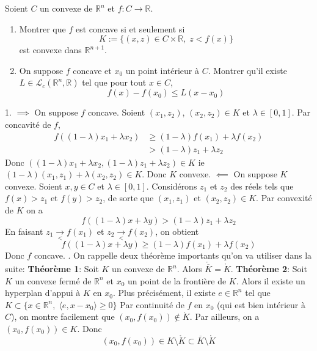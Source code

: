 \documentclass{fancybook}
\begin{document}
\begin{exercice}
Soient $C$ un convexe de $\mathbb R^n$ et $f:C\to \mathbb R$.
\begin{enumerate}
\item Montrer que $f$ est concave si et seulement si $$K:=\{(x,z)\in C\times \mathbb R, \; z<f(x)\}$$ est convexe dans $\mathbb R^{n+1}$.
\item On suppose $f$ concave et $x_0$ un point intérieur à $C$. Montrer qu'il existe $L\in \mathcal L_c(\mathbb R^n,\mathbb R)$ tel que pour tout $x\in C$, $$f(x)-f(x_0)\leq L(x-x_0)$$
\end{enumerate}
\end{exercice}
1. $\implies$ On suppose $f$ concave. Soient $(x_1,z_2)$, $(x_2,z_2)\in K$ et $\lambda \in [0,1]$. Par concavité de $f$,
$$\begin{aligned}
f((1-\lambda)x_1+\lambda x_2) &\geq (1-\lambda)f(x_1) + \lambda f(x_2)\\
&> (1-\lambda)z_1 + \lambda z_2
\end{aligned}$$
Donc $((1-\lambda)x_1+\lambda x_2, (1-\lambda)z_1 + \lambda z_2)\in K$ ie $(1-\lambda)(x_1,z_1)+\lambda (x_2,z_2)\in K$. \newline
Donc $K$ convexe. \newline 
\newline
$\impliedby$ On suppose $K$ convexe. Soient $x,y\in C$ et $\lambda \in [0,1]$. Considérons $z_1$ et $z_2$ des réels tels que $f(x)>z_1$ et $f(y)>z_2$, de sorte que $(x_1,z_1)$ et $(x_2,z_2)\in K$. Par convexité de $K$ on a $$f((1-\lambda)x+\lambda y)>(1-\lambda)z_1 + \lambda z_2 $$
En faisant $z_1\xrightarrow[<]{}f(x_1)$ et $z_2\xrightarrow[<]{}f(x_2)$, on obtient $$f((1-\lambda)x+\lambda y)\geq (1-\lambda)f(x_1) + \lambda f(x_2) $$
Donc $f$ concave.\newline
{}. On rappelle deux théorème importants qu'on va utiliser dans la suite:\newline
\textbf{Théorème 1}: Soit $K$ un convexe de $\mathbb R^n$. Alors $\mathring{\overline K} = \mathring K$.\newline 
\textbf{Théorème 2}: Soit $K$ un convexe fermé de $\mathbb R^n$ et $x_0$ un point de la frontière de $K$. Alors il existe un hyperplan d'appui à $K$ en $x_0$. Plus précisément, il existe $e\in \mathbb R^n$ tel que $K\subset \{x\in \mathbb R^n, \; \langle e,x-x_0\rangle\geq 0\}$ \newline 
\newline 
Par continuité de $f$ en $x_0$ (qui est bien intérieur à $C$), on montre facilement que $(x_0,f(x_0))\notin \mathring K$. Par ailleurs, on a $(x_0,f(x_0))\in K$. Donc $$(x_0,f(x_0))\in K\setminus \mathring K\subset \overline K \setminus \mathring K$$
\end{document}
